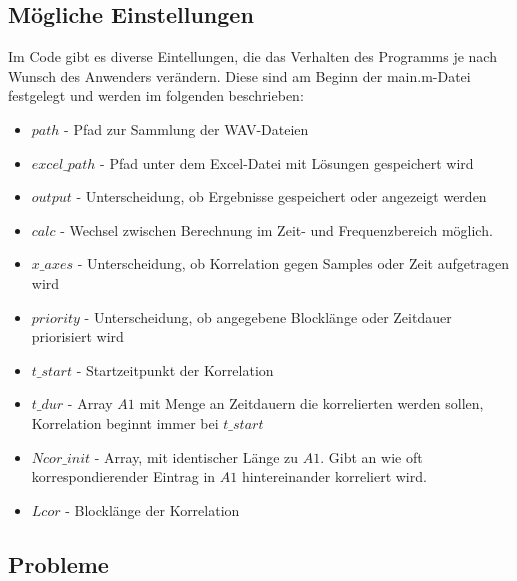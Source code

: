 \subsection{Mögliche Einstellungen}
Im Code gibt es diverse Eintellungen, die das Verhalten des Programms je nach Wunsch des Anwenders verändern. Diese sind am Beginn der main.m-Datei festgelegt und werden im folgenden beschrieben:
\begin{itemize} 
\item $path$ - Pfad zur Sammlung der WAV-Dateien
\item $excel\_path$ - Pfad unter dem Excel-Datei mit Lösungen gespeichert wird
\item $output$ - Unterscheidung, ob Ergebnisse gespeichert oder angezeigt werden
\item $calc$ - Wechsel zwischen Berechnung im Zeit- und Frequenzbereich möglich.
\item $x\_axes$ - Unterscheidung, ob Korrelation gegen Samples oder Zeit aufgetragen wird
\item $priority$ - Unterscheidung, ob angegebene Blocklänge oder Zeitdauer priorisiert wird
\item $t\_start$ - Startzeitpunkt der Korrelation
\item $t\_dur$ - Array $A1$ mit Menge an Zeitdauern die korrelierten werden sollen, Korrelation beginnt immer bei $t\_start$
\item $Ncor\_init$ - Array, mit identischer Länge zu $A1$. Gibt an wie oft korrespondierender Eintrag in $A1$ hintereinander korreliert wird. 
\item $Lcor$ - Blocklänge der Korrelation
\end{itemize}
\subsection{Probleme} 
